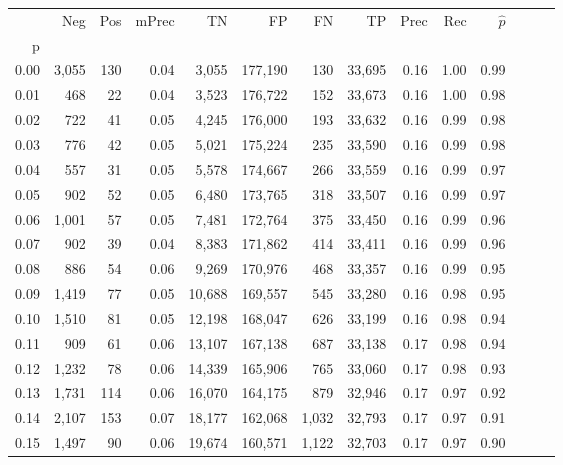 \begin{tabular}{rrrrrrrrrrrrrr}
\toprule
{} &    Neg &  Pos & mPrec &       TN &       FP &      FN &      TP &  Prec &   Rec & $\hat{p}$ \\
p    &        &      &       &          &          &         &         &       &       &           \\
\midrule
0.00 &  3,055 &  130 &  0.04 &    3,055 &  177,190 &     130 &  33,695 &  0.16 &  1.00 &      0.99 \\
0.01 &    468 &   22 &  0.04 &    3,523 &  176,722 &     152 &  33,673 &  0.16 &  1.00 &      0.98 \\
0.02 &    722 &   41 &  0.05 &    4,245 &  176,000 &     193 &  33,632 &  0.16 &  0.99 &      0.98 \\
0.03 &    776 &   42 &  0.05 &    5,021 &  175,224 &     235 &  33,590 &  0.16 &  0.99 &      0.98 \\
0.04 &    557 &   31 &  0.05 &    5,578 &  174,667 &     266 &  33,559 &  0.16 &  0.99 &      0.97 \\
0.05 &    902 &   52 &  0.05 &    6,480 &  173,765 &     318 &  33,507 &  0.16 &  0.99 &      0.97 \\
0.06 &  1,001 &   57 &  0.05 &    7,481 &  172,764 &     375 &  33,450 &  0.16 &  0.99 &      0.96 \\
0.07 &    902 &   39 &  0.04 &    8,383 &  171,862 &     414 &  33,411 &  0.16 &  0.99 &      0.96 \\
0.08 &    886 &   54 &  0.06 &    9,269 &  170,976 &     468 &  33,357 &  0.16 &  0.99 &      0.95 \\
0.09 &  1,419 &   77 &  0.05 &   10,688 &  169,557 &     545 &  33,280 &  0.16 &  0.98 &      0.95 \\
0.10 &  1,510 &   81 &  0.05 &   12,198 &  168,047 &     626 &  33,199 &  0.16 &  0.98 &      0.94 \\
0.11 &    909 &   61 &  0.06 &   13,107 &  167,138 &     687 &  33,138 &  0.17 &  0.98 &      0.94 \\
0.12 &  1,232 &   78 &  0.06 &   14,339 &  165,906 &     765 &  33,060 &  0.17 &  0.98 &      0.93 \\
0.13 &  1,731 &  114 &  0.06 &   16,070 &  164,175 &     879 &  32,946 &  0.17 &  0.97 &      0.92 \\
0.14 &  2,107 &  153 &  0.07 &   18,177 &  162,068 &   1,032 &  32,793 &  0.17 &  0.97 &      0.91 \\
0.15 &  1,497 &   90 &  0.06 &   19,674 &  160,571 &   1,122 &  32,703 &  0.17 &  0.97 &      0.90 \\

\end{tabular}
